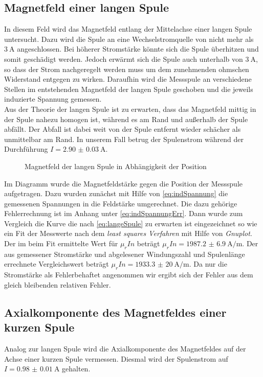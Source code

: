 \subsection{Magnetfeld einer langen Spule}
In diesem Feld wird das Magnetfeld entlang der Mittelachse einer langen Spule untersucht. Dazu wird die Spule an eine Wechselstromquelle von nicht mehr als $ \SI{3}{\ampere} $ angeschlossen. Bei höherer Stromstärke könnte sich die Spule überhitzen und somit geschädigt werden. Jedoch erwärmt sich die Spule auch unterhalb von $ \SI{3}{\ampere} $, so dass der Strom nachgeregelt werden muss um dem zunehmenden ohmschen Widerstand entgegen zu wirken. Daraufhin wird die Messspule an verschiedene Stellen im entstehenden Magnetfeld der langen Spule geschoben und die jeweils induzierte Spannung gemessen. \\
Aus der Theorie der langen Spule ist zu erwarten, dass das Magnetfeld mittig in der Spule nahezu homogen ist, während es am Rand und außerhalb der Spule abfällt. Der Abfall ist dabei weit von der Spule entfernt wieder schächer als unmittelbar am Rand.
In unserem Fall betrug der Spulenstrom während der Durchführung $ I = \SI{2.90(3)}{\ampere} $. 

\begin{figure}[H]

\caption{Magnetfeld der langen Spule in Abhängigkeit der Position}
\end{figure}

Im Diagramm wurde die Magnetfeldstärke gegen die Position der Messspule aufgetragen. Dazu wurden zunächst mit Hilfe von \eqref{eq:indSpannung} die gemessenen Spannungen in die Feldstärke umgerechnet. Die dazu gehörige Fehlerrechnung ist im Anhang unter \eqref{eq:indSpannungErr}. Dann wurde zum Vergleich die Kurve die nach \eqref{eq:langeSpule} zu erwarten ist eingezeichnet so wie ein Fit der Messwerte nach dem \textit{least squares Verfahren} mit Hilfe von \textit{Gnuplot}. Der im beim Fit ermittelte Wert für $ \mu_r I n $ beträgt $ \mu_r I n = \SI{1987.2(69)}{\ampere\per\meter} $. Der aus gemessener Stromstärke und abgelesener Windungszahl und Spulenlänge errechnete Vergleichswert beträgt $ \mu_r I n = \SI{1933.3(200)}{\ampere\per\meter} $. Da nur die Stromstärke als Fehlerbehaftet angenommen wir ergibt sich der Fehler aus dem gleich bleibenden relativen Fehler.


\subsection{Axialkomponente des Magnetfeldes einer kurzen Spule}
Analog zur langen Spule wird die Axialkomponente des Magnetfeldes auf der Achse einer kurzen Spule vermessen. Diesmal wird der Spulenstrom auf $I=\SI{0.98(1)}{\ampere}$ gehalten.

